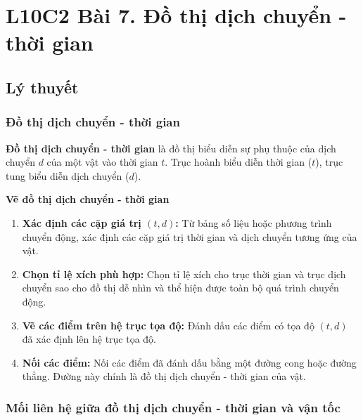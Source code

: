 

\section*{L10C2 Bài 7. Đồ thị dịch chuyển - thời gian}

\subsection{Lý thuyết}

\subsubsection{Đồ thị dịch chuyển - thời gian}

\begin{kienthuc}
\textbf{Đồ thị dịch chuyển - thời gian} là đồ thị biểu diễn sự phụ thuộc của dịch chuyển $d$ của một vật vào thời gian $t$. Trục hoành biểu diễn thời gian ($t$), trục tung biểu diễn dịch chuyển ($d$).
\end{kienthuc}

\begin{hoatdong}
\textbf{Vẽ đồ thị dịch chuyển - thời gian}
\begin{enumerate}
    \item \textbf{Xác định các cặp giá trị $(t, d)$:} Từ bảng số liệu hoặc phương trình chuyển động, xác định các cặp giá trị thời gian và dịch chuyển tương ứng của vật.
    \item \textbf{Chọn tỉ lệ xích phù hợp:} Chọn tỉ lệ xích cho trục thời gian và trục dịch chuyển sao cho đồ thị dễ nhìn và thể hiện được toàn bộ quá trình chuyển động.
    \item \textbf{Vẽ các điểm trên hệ trục tọa độ:} Đánh dấu các điểm có tọa độ $(t, d)$ đã xác định lên hệ trục tọa độ.
    \item \textbf{Nối các điểm:} Nối các điểm đã đánh dấu bằng một đường cong hoặc đường thẳng. Đường này chính là đồ thị dịch chuyển - thời gian của vật.
\end{enumerate}
\end{hoatdong}

\subsubsection{Mối liên hệ giữa đồ thị dịch chuyển - thời gian và vận tốc}

